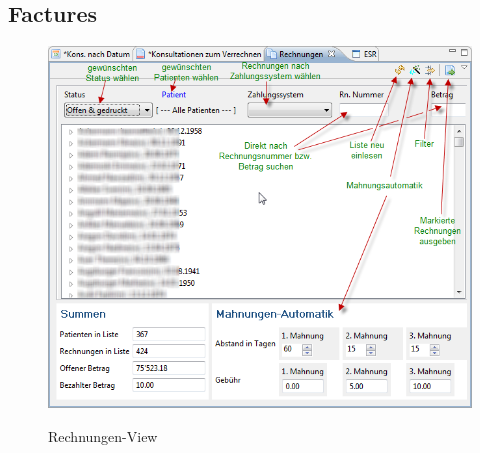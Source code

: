 \subsection{Factures}
\begin{figure}[ht]
  \includegraphics[width=1.0\textwidth]{images/rechnungsview}\\
  \caption{Rechnungen-View}\label{fig:rechnungen}
\end{figure}

